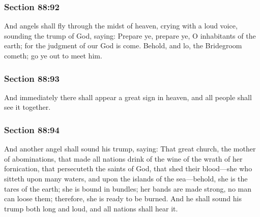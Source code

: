 	\subsubsection{Section 88:92} %
		\label{DC88-92}

		And angels shall fly through the midst of heaven, crying with a loud voice, sounding the trump of God, saying: Prepare ye, prepare ye, O inhabitants of the earth; for the judgment of our God is come. Behold, and lo, the Bridegroom cometh; go ye out to meet him.


	\subsubsection{Section 88:93} %
		\label{DC88-93}

		And immediately there shall appear a great sign in heaven, and all people shall see it together.


	\subsubsection{Section 88:94} %
		\label{DC88-94}

		And another angel shall sound his trump, saying: That great church, the mother of abominations, that made all nations drink of the wine of the wrath of her fornication, that persecuteth the saints of God, that shed their blood---she who sitteth upon many waters, and upon the islands of the sea---behold, she is the tares of the earth; she is bound in bundles; her bands are made strong, no man can loose them; therefore, she is ready to be burned. And he shall sound his trump both long and loud, and all nations shall hear it.

